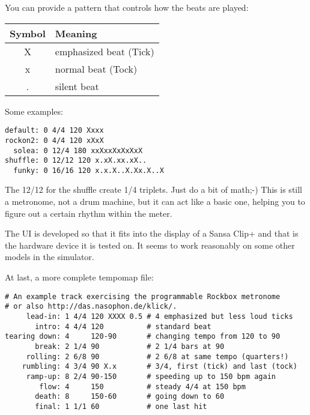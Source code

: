 You can provide a pattern that controls how the beats are played:
\begin{center}
\begin{tabular}{c|l}
    Symbol & Meaning \\
    \hline
    X & emphasized beat (Tick) \\
    x & normal beat (Tock) \\
    . & silent beat
\end{tabular}
\end{center}

Some examples:
\begin{verbatim}
default: 0 4/4 120 Xxxx
rockon2: 0 4/4 120 xXxX
  solea: 0 12/4 180 xxXxxXxXxXxX
shuffle: 0 12/12 120 x.xX.xx.xX..
  funky: 0 16/16 120 x.x.X..X.Xx.X..X
\end{verbatim}
The 12/12 for the shuffle create 1/4 triplets. Just do a bit of math;-)
This is still a metronome, not a drum machine, but it can act like a basic
one, helping you to figure out a certain rhythm within the meter.

The UI is developed so that it fits into the display of a Sansa Clip+ and
that is the hardware device it is tested on. It seems to work reasonably
on some other models in the simulator.

At last, a more complete tempomap file:
\begin{verbatim}
# An example track exercising the programmable Rockbox metronome
# or also http://das.nasophon.de/klick/.
     lead-in: 1 4/4 120 XXXX 0.5 # 4 emphasized but less loud ticks
       intro: 4 4/4 120          # standard beat
tearing down: 4     120-90       # changing tempo from 120 to 90
       break: 2 1/4 90           # 2 1/4 bars at 90
     rolling: 2 6/8 90           # 2 6/8 at same tempo (quarters!)
    rumbling: 4 3/4 90 X.x       # 3/4, first (tick) and last (tock)
     ramp-up: 8 2/4 90-150       # speeding up to 150 bpm again
        flow: 4     150          # steady 4/4 at 150 bpm
       death: 8     150-60       # going down to 60
       final: 1 1/1 60           # one last hit
\end{verbatim}
